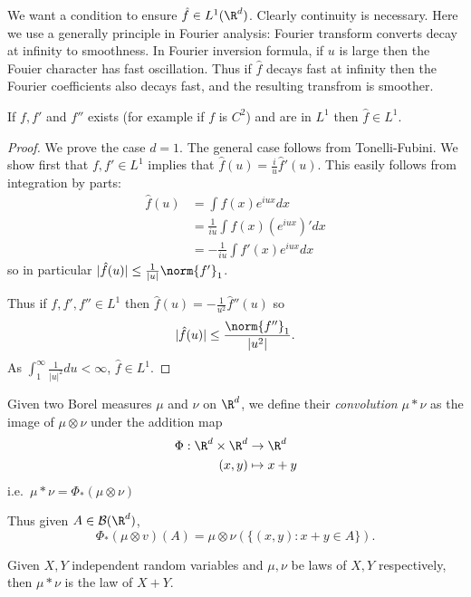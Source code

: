\documentclass[a4paper]{article}
\begin{document}
We want a condition to ensure \(\hat f \in L^1(\R^d)\). Clearly continuity is necessary. Here we use a generally principle in Fourier analysis: Fourier transform converts decay at infinity to smoothness. In Fourier inversion formula, if \(u\) is large then the Fouier character has fast oscillation. Thus if \(\hat f\) decays fast at infinity then the Fourier coefficients also decays fast, and the resulting transfrom is smoother.

\begin{proposition}
  If \(f, f'\) and \(f''\) exists (for example if \(f\) is \(C^2\)) and are in \(L^1\) then \(\hat f \in L^1\).
\end{proposition}

\begin{proof}
  We prove the case \(d = 1\). The general case follows from Tonelli-Fubini. We show first that \(f, f' \in L^1\) implies that \(\hat f(u) = \frac{i}{u} \hat f'(u)\). This easily follows from integration by parts:
  \begin{align*}
    \hat f(u)
    &= \int f(x) e^{iux} dx \\
    &= \frac{1}{iu} \int f(x) (e^{iux})' dx \\
    &= -\frac{1}{iu} \int f'(x) e^{iux} dx
  \end{align*}
  so in particular \(|\hat f(u)| \leq \frac{1}{|u|} \norm{f'}_1\).

  Thus if \(f, f', f'' \in L^1\) then \(\hat f(u) = - \frac{1}{u^2} \hat f''(u)\) so
  \[
    |\hat f(u)| \leq \frac{\norm{f''}_1}{|u^2|}.
  \]
  As \(\int_1^\infty \frac{1}{|u|^2} du < \infty\), \(\hat f \in L^1\).
\end{proof}

\begin{definition}[convolution]
  Given two Borel measures \(\mu\) and \(\nu\) on \(\R^d\), we define their \emph{convolution} \(\mu * \nu\) as the image of \(\mu \otimes \nu\) under the addition map
  \begin{align*}
    \Phi: \R^d \times \R^d &\to \R^d \\
    (x, y) &\mapsto x + y
  \end{align*}
  i.e.\ \(\mu * \nu = \Phi_*(\mu \otimes \nu)\)
\end{definition}

Thus given \(A \in \mathcal B(\R^d)\),
\[
  \Phi_*(\mu \otimes v)(A) = \mu \otimes \nu (\{(x, y): x + y \in A\}).
\]

\begin{eg}
  Given \(X, Y\) independent random variables and \(\mu, \nu\) be laws of \(X, Y\) respectively, then \(\mu * \nu\) is the law of \(X + Y\).
\end{eg}
\end{document}
